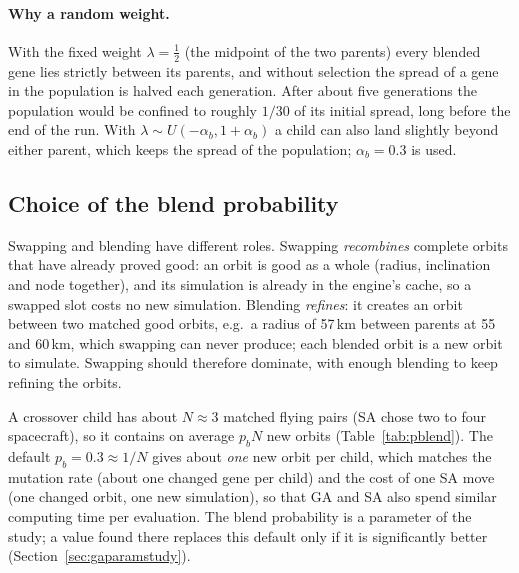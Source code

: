 \paragraph{Why a random weight.} With the fixed weight $\lambda=\tfrac12$ (the midpoint of the two
parents) every blended gene lies strictly between its parents, and without selection the spread
of a gene in the population is halved each generation. After about five generations the
population would be confined to roughly $1/30$ of its initial spread, long before the end of the
run. With $\lambda\sim U(-\alpha_b,1+\alpha_b)$ a child can also land slightly beyond either
parent, which keeps the spread of the population; $\alpha_b=0.3$ is used.

\subsection{Choice of the blend probability}
Swapping and blending have different roles. Swapping \emph{recombines} complete orbits that have
already proved good: an orbit is good as a whole (radius, inclination and node together), and its
simulation is already in the engine's cache, so a swapped slot costs no new simulation. Blending
\emph{refines}: it creates an orbit between two matched good orbits, e.g.\ a radius of 57\,km between
parents at 55 and 60\,km, which swapping can never produce; each blended orbit is a new orbit to
simulate. Swapping should therefore dominate, with enough blending to keep refining the orbits.

A crossover child has about $N\approx3$ matched flying pairs (\ac{SA} chose two to four
spacecraft), so it contains on average $p_bN$ new orbits (Table~\ref{tab:pblend}). The default
$p_b=0.3\approx1/N$ gives about \emph{one} new orbit per child, which matches the mutation rate
(about one changed gene per child) and the cost of one \ac{SA} move (one changed orbit, one new
simulation), so that \ac{GA} and \ac{SA} also spend similar computing time per evaluation.
The blend probability is a parameter of the study; a value found there replaces this default only
if it is significantly better (Section~\ref{sec:gaparamstudy}).

